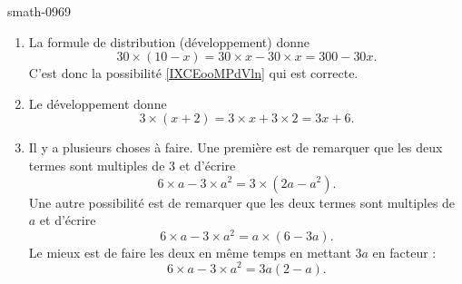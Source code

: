 
\begin{corrige}{smath-0969}

    \begin{enumerate}
        \item
            La formule de distribution (développement) donne
            \begin{equation}
                30\times (10-x)=30\times x-30\times x=300-30x.
            \end{equation}
            C'est donc la possibilité \ref{IXCEooMPdVln} qui est correcte.
        \item
            Le développement donne
            \begin{equation}
                3\times (x+2)=3\times x+3\times 2=3x+6.
            \end{equation}
        \item
            Il y a plusieurs choses à faire. Une première est de remarquer que les deux termes sont multiples de \( 3\) et d'écrire
            \begin{equation}
                6\times a-3\times a^2=3\times (2a-a^2).
            \end{equation}
            Une autre possibilité est de remarquer que les deux termes sont multiples de \( a\) et d'écrire
            \begin{equation}
                6\times a-3\times a^2=a\times (6-3a).
            \end{equation}
            Le mieux est de faire les deux en même temps en mettant \( 3a\) en facteur :
            \begin{equation}
                6\times a-3\times a^2=3a(2-a).
            \end{equation}
    \end{enumerate}

\end{corrige}
